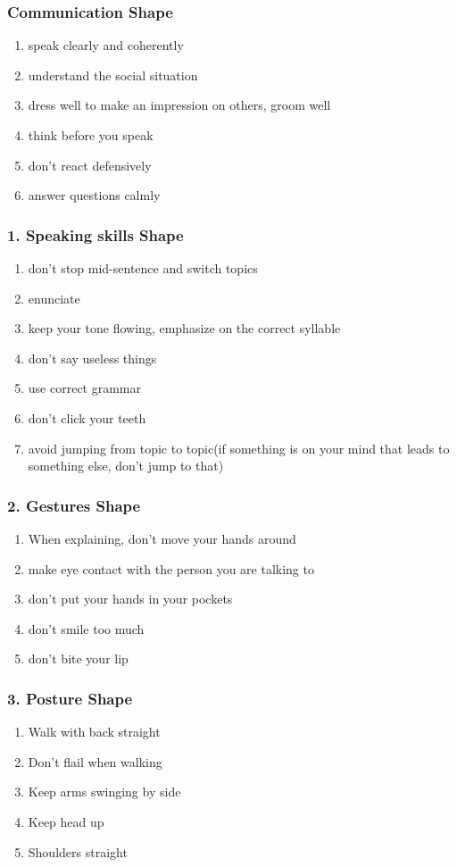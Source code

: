 \begin{frame} 
\frametitle{Communication Shape} 
\begin{enumerate} 
\item \small speak clearly and coherently 
\item \small understand the social situation
\item \small dress well to make an impression on others, groom well
\item \small think before you speak
\item \small don't react defensively
\item \small answer questions calmly 
\end{enumerate}
\end{frame} 

\begin{frame} 
\frametitle{1. Speaking skills Shape} 
\begin{enumerate} 
\item \small don't stop mid-sentence and switch topics 
\item \small enunciate 
\item \small keep your tone flowing, emphasize on the correct syllable
\item \small don't say useless things 
\item \small use correct grammar 
\item \small don't click your teeth 
\item \small avoid jumping from topic to topic(if something is on your mind that leads to something else, don't jump to that)
\end{enumerate}
\end{frame} 

\begin{frame} 
\frametitle{2. Gestures Shape} 
\begin{enumerate} 
\item \small When explaining,  don't move your hands around
\item \small make eye contact with the person you are talking to
\item \small don't put your hands in your pockets
\item \small don't smile too much 
\item \small don't bite your lip 
\end{enumerate} 
\end{frame} 

\begin{frame} 
\frametitle{3. Posture Shape} 
\begin{enumerate} 
\item \small Walk with back straight
\item \small Don't flail when walking
\item \small Keep arms swinging by side
\item \small Keep head up 
\item \small Shoulders straight 
\end{enumerate}
\end{frame}


